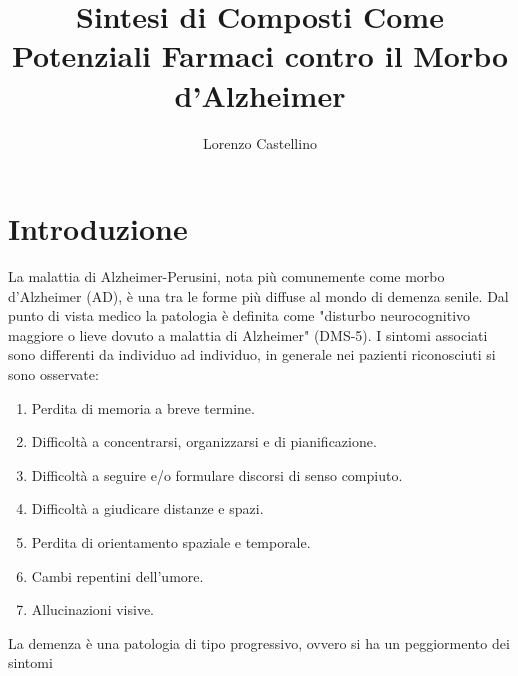 \documentclass[a4paper, 12pt]{book}
\title{Sintesi di Composti Come Potenziali Farmaci contro il Morbo d'Alzheimer}
\author{Lorenzo Castellino}
\begin{document}
\maketitle
\setcounter{page}{0}
\tableofcontents
\newpage
{}

\chapter*{Introduzione}
La malattia di Alzheimer-Perusini, nota più comunemente come morbo d'Alzheimer (AD), è una tra le forme più diffuse al mondo di demenza senile. Dal punto di vista medico la patologia è definita come "disturbo neurocognitivo maggiore o lieve dovuto a malattia di Alzheimer" (DMS-5).
I sintomi associati sono differenti da individuo ad individuo, in generale nei pazienti riconosciuti si sono osservate:
\begin{enumerate}
	\item Perdita di memoria a breve termine.
	\item Difficoltà a concentrarsi, organizzarsi e di pianificazione.
	\item Difficoltà a seguire e/o formulare discorsi di senso compiuto.
	\item Difficoltà a giudicare distanze e spazi.
	\item Perdita di orientamento spaziale e temporale.
	\item Cambi repentini dell'umore.
	\item Allucinazioni visive.
\end{enumerate}
La demenza è una patologia di tipo progressivo, ovvero si ha un peggiormento dei sintomi 
\end{document}

